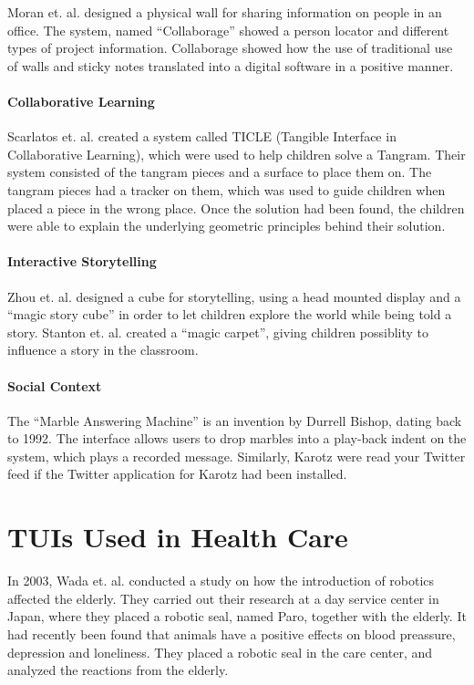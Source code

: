 Moran et. al. designed a physical wall for sharing information on people in an office\cite{moran1999design}. The system, named ``Collaborage'' showed a person locator and different types of project information. Collaborage showed how the use of traditional use of walls and sticky notes translated into a digital software in a positive manner.


\paragraph{Collaborative Learning} 
Scarlatos et. al. created a system called TICLE (Tangible Interface in Collaborative Learning), which were used to help children solve a Tangram\cite{scarlatos1999ticle}. Their system consisted of the tangram pieces and a surface to place them on. The tangram pieces had a tracker on them, which was used to guide children when placed a piece in the wrong place. Once the solution had been found, the children were able to explain the underlying geometric principles behind their solution.   

\paragraph{Interactive Storytelling} 
Zhou et. al. designed a cube for storytelling, using a head mounted display and a ``magic story cube'' in order to let children explore the world while being told a story\cite{zhou2004magic}. Stanton et. al. created a ``magic carpet'', giving children possiblity to influence a story in the classroom\cite{stanton2001classroom}. 

\paragraph{Social Context} 
The ``Marble Answering Machine'' is an invention by Durrell Bishop, dating back to 1992\cite{crampton1995hand}. The interface allows users to drop marbles into a play-back indent on the system, which plays a recorded message. Similarly, Karotz were read your Twitter feed if the Twitter application for Karotz had been installed.   


\section{TUIs Used in Health Care}
\label{sec:effectofrobots}
In 2003, Wada et. al. conducted a study on how the introduction of robotics affected the elderly\cite{wada2004effects}. They carried out their research at a day service center in Japan, where they placed a robotic seal, named Paro, together with the elderly. It had recently been found that animals have a positive effects on blood preassure, depression and loneliness. They placed a robotic seal in the care center, and analyzed the reactions from the elderly. 

